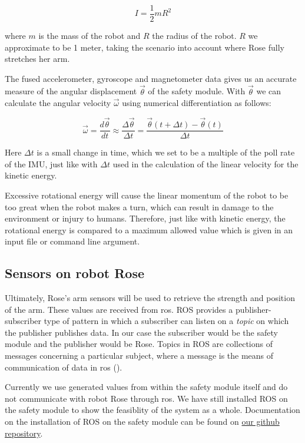 \documentclass[12pt]{scrreprt}
\begin{document}
\begin{equation}
    I = \frac{1}{2}mR^2
\end{equation}

where $m$ is the mass of the robot and $R$ the radius of the robot. $R$ we approximate to be 1 meter, taking the scenario into account where Rose fully stretches her arm.
\par
The fused accelerometer, gyroscope and magnetometer data gives us an accurate measure of the angular displacement $\vec{\theta}$ of the safety module. With $\vec{\theta}$ we can calculate the angular velocity $\vec{\omega}$ using numerical differentiation as follows:

\begin{equation}
    \vec{\omega} = \frac{d\vec{\theta}}{dt} \approx \frac{\Delta\vec{\theta}}{\Delta t} = \frac{\vec{\theta}(t + \Delta t ) - \vec{\theta}(t)}{\Delta t}
\end{equation}

Here $\Delta t$ is a small change in time, which we set to be a multiple of the poll rate of the IMU, just like with $\Delta t$ used in the calculation of the linear velocity for the kinetic energy.
\par
Excessive rotational energy will cause the linear momentum of the robot to be too great when the robot makes a turn, which can result in damage to the environment or injury to humans. Therefore, just like with kinetic energy, the rotational energy is compared to a maximum allowed value which is given in an input file or command line argument.

\subsection{Sensors on robot Rose}
Ultimately, Rose's arm sensors will be used to retrieve the strength and position of the arm. These values are received from \acrshort{ros}. ROS provides a publisher-subscriber type of pattern in which a subscriber can listen on a \textit{topic} on which the publisher publishes data. In our case the subscriber would be the safety module and the publisher would be Rose. Topics in ROS are collections of messages concerning a particular subject, where a message is the means of communication of data in \acrshort{ros} (\cite{agitr}).
\par
Currently we use generated values from within the safety module itself and do not communicate with robot Rose through \acrshort{ros}. We have still installed ROS on the safety module to show the feasiblity of the system as a whole. Documentation on the installation of ROS on the safety module can be found on \href{https://github.com/Yousousen/safety-module-for-care-robot-rose.git}{our github repository}.
\end{document}
